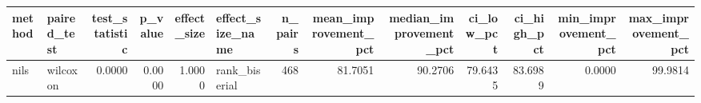 \begin{tabular}{llrrrlrrrrrrr}
\toprule
method & paired_test & test_statistic & p_value & effect_size & effect_size_name & n_pairs & mean_improvement_pct & median_improvement_pct & ci_low_pct & ci_high_pct & min_improvement_pct & max_improvement_pct \\
\midrule
nils & wilcoxon & 0.0000 & 0.0000 & 1.0000 & rank_biserial & 468 & 81.7051 & 90.2706 & 79.6435 & 83.6989 & 0.0000 & 99.9814 \\
\bottomrule
\end{tabular}
